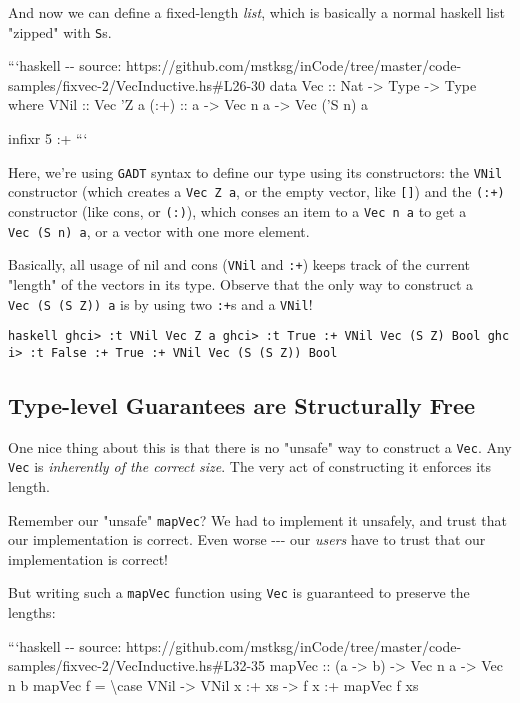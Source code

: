 \documentclass[]{article}
\begin{document}
And now we can define a fixed-length \emph{list}, which is basically a normal
haskell list "zipped" with \texttt{S}s.

```haskell -\/- source:
https://github.com/mstksg/inCode/tree/master/code-samples/fixvec-2/VecInductive.hs\#L26-30
data Vec :: Nat -\textgreater{} Type -\textgreater{} Type where VNil :: Vec 'Z a
(:+) :: a -\textgreater{} Vec n a -\textgreater{} Vec ('S n) a

infixr 5 :+ ```

Here, we're using \texttt{GADT} syntax to define our type using its
constructors: the \texttt{VNil} constructor (which creates a
\texttt{Vec\ \textquotesingle{}Z\ a}, or the empty vector, like \texttt{{[}{]}})
and the \texttt{(:+)} constructor (like cons, or \texttt{(:)}), which conses an
item to a \texttt{Vec\ n\ a} to get a \texttt{Vec\ (\textquotesingle{}S\ n)\ a},
or a vector with one more element.

Basically, all usage of nil and cons (\texttt{VNil} and \texttt{:+}) keeps track
of the current "length" of the vectors in its type. Observe that the only way to
construct a
\texttt{Vec\ (\textquotesingle{}S\ (\textquotesingle{}S\ \textquotesingle{}Z))\ a}
is by using two \texttt{:+}s and a \texttt{VNil}!

\texttt{haskell\ ghci\textgreater{}\ :t\ VNil\ Vec\ \textquotesingle{}Z\ a\ ghci\textgreater{}\ :t\ True\ :+\ VNil\ Vec\ (\textquotesingle{}S\ \textquotesingle{}Z)\ Bool\ ghci\textgreater{}\ :t\ False\ :+\ True\ :+\ VNil\ Vec\ (\textquotesingle{}S\ (\textquotesingle{}S\ \textquotesingle{}Z))\ Bool}

\subsection{Type-level Guarantees are Structurally Free}

One nice thing about this is that there is no "unsafe" way to construct a
\texttt{Vec}. Any \texttt{Vec} is \emph{inherently of the correct size}. The
very act of constructing it enforces its length.

Remember our "unsafe" \texttt{mapVec}? We had to implement it unsafely, and
trust that our implementation is correct. Even worse -\/-\/- our \emph{users}
have to trust that our implementation is correct!

But writing such a \texttt{mapVec} function using \texttt{Vec} is guaranteed to
preserve the lengths:

```haskell -\/- source:
https://github.com/mstksg/inCode/tree/master/code-samples/fixvec-2/VecInductive.hs\#L32-35
mapVec :: (a -\textgreater{} b) -\textgreater{} Vec n a -\textgreater{} Vec n b
mapVec f = \textbackslash{}case VNil -\textgreater{} VNil x :+ xs
-\textgreater{} f x :+ mapVec f xs
\end{document}
